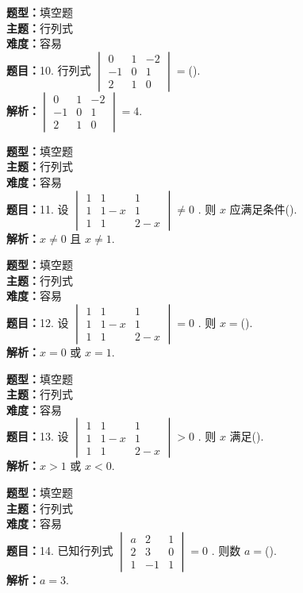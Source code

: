 \documentclass{ctexart}
\newenvironment{question}[5]{%
	\noindent\textbf{题型：}#1\\
	\textbf{主题：}#2\\
	\textbf{难度：}#3\\
	\textbf{题目：}#4\\
	\textbf{解析：}#5\\
	\vspace{1em}
}{}
\begin{document}
	\begin{question}
		{填空题}
		{行列式}
		{容易}
		{10. 行列式 \(\begin{vmatrix} 0 & 1 & -2 \\ -1 & 0 & 1 \\ 2 & 1 & 0\end{vmatrix}=\)(\qquad). }
		{\(\begin{vmatrix} 0 & 1 & -2 \\ -1 & 0 & 1 \\ 2 & 1 & 0\end{vmatrix}=4\).}
	\end{question}
	
	\begin{question}
		{填空题}
		{行列式}
		{容易}
		{11. 设 \(\begin{vmatrix} 1 & 1 & 1 \\ 1 & 1-x & 1 \\ 1 & 1 & 2-x\end{vmatrix} \neq 0\) . 则 \(x\) 应满足条件(\qquad). }
		{\(x \neq 0\) 且 \(x \neq 1\).}
	\end{question}
	
	\begin{question}
		{填空题}
		{行列式}
		{容易}
		{12. 设 \(\begin{vmatrix} 1 & 1 & 1 \\ 1 & 1-x & 1 \\ 1 & 1 & 2-x\end{vmatrix}=0\) . 则 \(x=\)(\qquad). }
		{\(x=0\) 或 \(x=1\).}
	\end{question}
	
	\begin{question}
		{填空题}
		{行列式}
		{容易}
		{13. 设 \(\begin{vmatrix} 1 & 1 & 1 \\ 1 & 1-x & 1 \\ 1 & 1 & 2-x\end{vmatrix}>0\) . 则 \(x\) 满足(\qquad). }
		{\(x>1\) 或 \(x<0\).}
	\end{question}
	
	\begin{question}
		{填空题}
		{行列式}
		{容易}
		{14. 已知行列式 \(\begin{vmatrix} a & 2 & 1 \\ 2 & 3 & 0 \\ 1 & -1 & 1\end{vmatrix}=0\) . 则数 \(a=\)(\qquad). }
		{\(a=3\).}
	\end{question}
	
\end{document}
